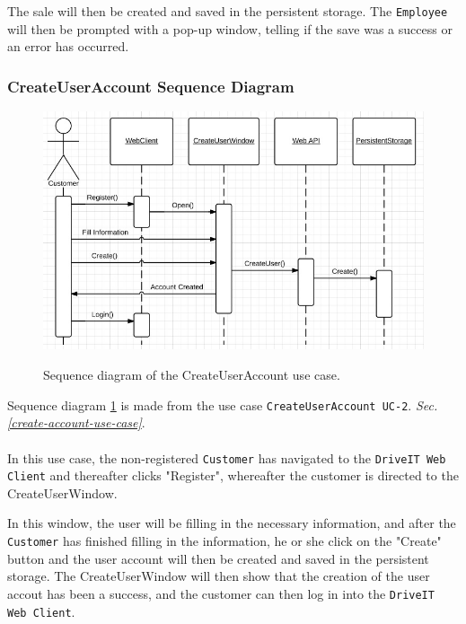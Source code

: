 The sale will then be created and saved in the persistent storage. The \texttt{Employee} will then be prompted with a pop-up window, telling if the save was a success or an error has occurred.

\subsubsection{CreateUserAccount Sequence Diagram}
\begin{figure}[H]
	\centering
		\includegraphics[width=\textwidth]{Figures/SequenceDiagram-CreateUserAccount}\\
	\caption{Sequence diagram of the CreateUserAccount use case.}
  \label{fig:SequenceDiagram-CreateUserAccount}
\end{figure}

Sequence diagram \ref{fig:SequenceDiagram-CreateUserAccount} is made from the use case \texttt{CreateUserAccount UC-2}. \textit{Sec. \ref{create-account-use-case}}. \\\\
In this use case, the non-registered \texttt{Customer} has navigated to the \texttt{DriveIT Web Client} and thereafter clicks "Register", whereafter the customer is directed to the CreateUserWindow. 

In this window, the user will be filling in the necessary information, and after the \texttt{Customer} has finished filling in the information, he or she click on the "Create" button and the user account will then be created and saved in the persistent storage. The CreateUserWindow will then show that the creation of the user accout has been a success, and the customer can then log in into the \texttt{DriveIT Web Client}.

